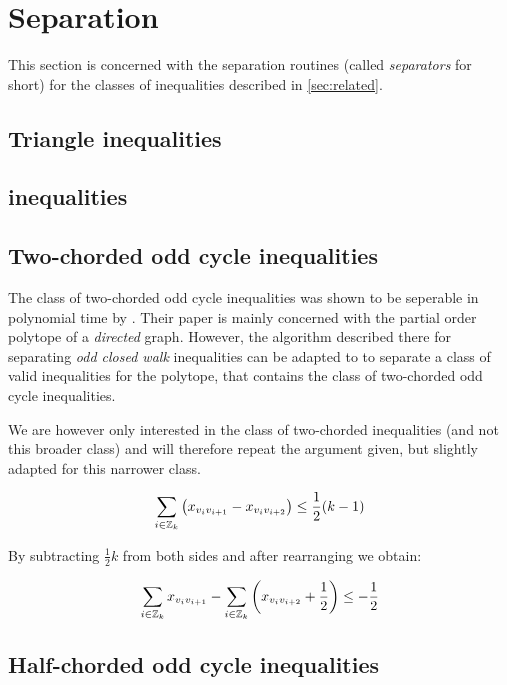 \section{Separation}\label{sec:separation}
This section is concerned with the separation routines (called \textit{separators} for short) for the classes of inequalities described in \cref{sec:related}.

\subsection{Triangle inequalities}\label{subsec:triangle_separator}

\subsection{\texorpdfstring{\ST}{[S:T]} inequalities}\label{subsec:st_separator}

\subsection{Two-chorded odd cycle inequalities}\label{subsec:two_chorded_separator}
The class of two-chorded odd cycle inequalities was shown to be seperable in polynomial time by \cite{mullerPartialOrderPolytope1996}.
Their paper is mainly concerned with the partial order polytope of a \textit{directed} graph.
However, the algorithm described there for separating \textit{odd closed walk} inequalities can be adapted to to separate a class of valid inequalities for the \CP polytope, that contains the class of two-chorded odd cycle inequalities.

We are however only interested in the class of two-chorded inequalities (and not this broader class) and will therefore repeat the argument given, but slightly adapted for this narrower class.

\begin{equation*}
	\sum_{i \in \mathbb{Z}_k} \left( x_{v_i v_{i+1}} - x_{v_i v_{i+2}} \right) \leq \frac{1}{2} (k-1)
\end{equation*}

By subtracting $\frac{1}{2}k$ from both sides and after rearranging we obtain:

\begin{equation*}
	\sum_{i \in \mathbb{Z}_k} x_{v_i v_{i+1}} - \sum_{i \in \mathbb{Z}_k} \left(x_{v_i v_{i+2}} + \frac{1}{2} \right) \leq -\frac{1}{2}
\end{equation*}

\subsection{Half-chorded odd cycle inequalities}\label{subsec:half_chorded_separator}

